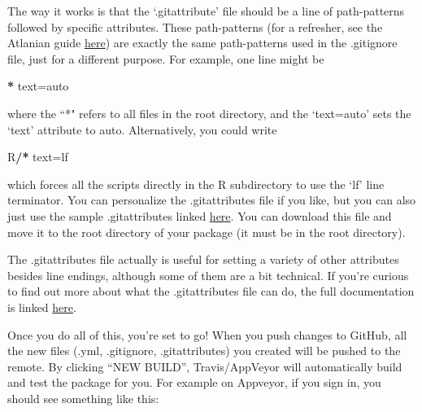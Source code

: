 \documentclass[]{book}
\newenvironment{Shaded}{\begin{snugshade}}{\end{snugshade}}
\newcommand{\StringTok}[1]{\textcolor[rgb]{0.31,0.60,0.02}{#1}}
\newcommand{\OperatorTok}[1]{\textcolor[rgb]{0.81,0.36,0.00}{\textbf{#1}}}
\newcommand{\ErrorTok}[1]{\textcolor[rgb]{0.64,0.00,0.00}{\textbf{#1}}}
\newcommand{\NormalTok}[1]{#1}
\begin{document}
The way it works is that the `.gitattribute' file should be a line of
path-patterns followed by specific attributes. These path-patterns (for
a refresher, see the Atlanian guide
\href{https://www.atlassian.com/git/tutorials/saving-changes/gitignore}{here})
are exactly the same path-patterns used in the .gitignore file, just for
a different purpose. For example, one line might be

\begin{Shaded}
\begin{Highlighting}[]
\OperatorTok{*}\StringTok{ }\NormalTok{text=auto}
\end{Highlighting}
\end{Shaded}

where the ``*" refers to all files in the root directory, and the
`text=auto' sets the `text' attribute to auto. Alternatively, you could
write

\begin{Shaded}
\begin{Highlighting}[]
\NormalTok{R}\OperatorTok{/}\ErrorTok{*}\StringTok{ }\NormalTok{text=lf}
\end{Highlighting}
\end{Shaded}

which forces all the scripts directly in the R subdirectory to use the
`lf' line terminator. You can personalize the .gitattributes file if you
like, but you can also just use the sample .gitattributes linked
\href{https://GitHub.com/krlmlr/r-appveyor/blob/master/.gitattributes}{here}.
You can download this file and move it to the root directory of your
package (it must be in the root directory).

The .gitattributes file actually is useful for setting a variety of
other attributes besides line endings, although some of them are a bit
technical. If you're curious to find out more about what the
.gitattributes file can do, the full documentation is linked
\href{https://git-scm.com/docs/gitattributes}{here}.

Once you do all of this, you're set to go! When you push changes to
GitHub, all the new files (.yml, .gitignore, .gitattributes) you created
will be pushed to the remote. By clicking ``NEW BUILD'', Travis/AppVeyor
will automatically build and test the package for you. For example on
Appveyor, if you sign in, you should see something like this:
\end{document}
